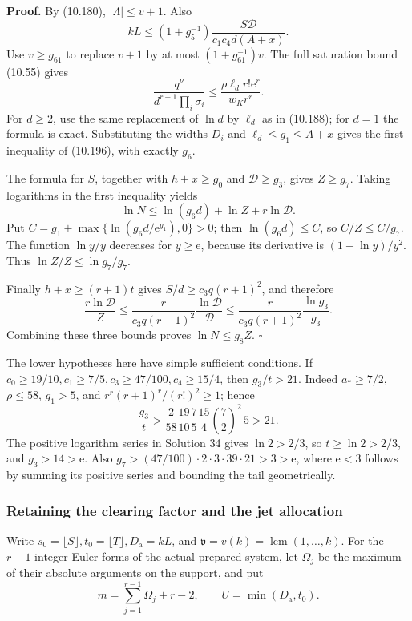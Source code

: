 \documentclass[
  11pt,
  a4paper,
]{article}
\begin{document}
\textbf{Proof.} By (10.180), \(|\Lambda|\le v+1\). Also \[
kL\le(1+g_5^{-1})\frac{S\mathcal D}{c_1c_4d(A+x)}.
\] Use \(v\ge g_{61}\) to replace \(v+1\) by at most
\((1+g_{61}^{-1})v\). The full saturation bound (10.55) gives \[
\frac{q^\nu}{d^{r+1}\prod_i\sigma_i}
\le\frac{\rho\ell_dr!\mathrm e^r}{w_Kr^r}.
\] For \(d\ge2\), use the same replacement of \(\ln d\) by \(\ell_d\) as
in (10.188); for \(d=1\) the formula is exact. Substituting the widths
\(D_i\) and \(\ell_d\le g_1\le A+x\) gives the first inequality of
(10.196), with exactly \(g_6\).

The formula for \(S\), together with \(h+x\ge g_0\) and
\(\mathcal D\ge g_3\), gives \(Z\ge g_7\). Taking logarithms in the
first inequality yields \[
\ln N\le\ln(g_6d)+\ln Z+r\ln\mathcal D.
\] Put \(C=g_1+\max\{\ln(g_6d/\mathrm e^{g_1}),0\}>0\); then
\(\ln(g_6d)\le C\), so \(C/Z\le C/g_7\). The function \(\ln y/y\)
decreases for \(y\ge\mathrm e\), because its derivative is
\((1-\ln y)/y^2\). Thus \(\ln Z/Z\le\ln g_7/g_7\).

Finally \(h+x\ge(r+1)t\) gives \(S/d\ge c_3q(r+1)^2\), and therefore \[
\frac{r\ln\mathcal D}{Z}
\le\frac r{c_3q(r+1)^2}\frac{\ln\mathcal D}{\mathcal D}
\le\frac r{c_3q(r+1)^2}\frac{\ln g_3}{g_3}.
\] Combining these three bounds proves \(\ln N\le g_8Z\). \(\square\)

The lower hypotheses here have simple sufficient conditions. If
\(c_0\ge19/10,c_1\ge7/5,c_3\ge47/100,c_4\ge15/4\), then \(g_3/\!t>21\).
Indeed \(a_*\ge7/2\), \(\rho\le58\), \(g_1>5\), and
\(r^r(r+1)^r/(r!)^2\ge1\); hence \[
\frac{g_3}{t}>
\frac2{58}\frac{19}{10}\frac75\frac{15}4
\left(\frac72\right)^2\,5>21.
\] The positive logarithm series in Solution 34 gives \(\ln2>2/3\), so
\(t\ge\ln2>2/3\), and \(g_3>14>\mathrm e\). Also
\(g_7>(47/100)\cdot2\cdot3\cdot39\cdot21>3>\mathrm e\), where
\(\mathrm e<3\) follows by summing its positive series and bounding the
tail geometrically.

\subsubsection{Retaining the clearing factor and the jet
allocation}\label{retaining-the-clearing-factor-and-the-jet-allocation}

Write \(s_0=\lfloor S\rfloor,t_0=\lfloor T\rfloor,D_{\mathrm a}=kL\),
and \(\mathfrak v=v(k)=\operatorname{lcm}(1,\ldots,k)\). For the \(r-1\)
integer Euler forms of the actual prepared system, let \(\Omega_j\) be
the maximum of their absolute arguments on the support, and put \[
m=\sum_{j=1}^{r-1}\Omega_j+r-2,\qquad
U=\min(D_{\mathrm a},t_0).
\tag{10.197}
\]
\end{document}
